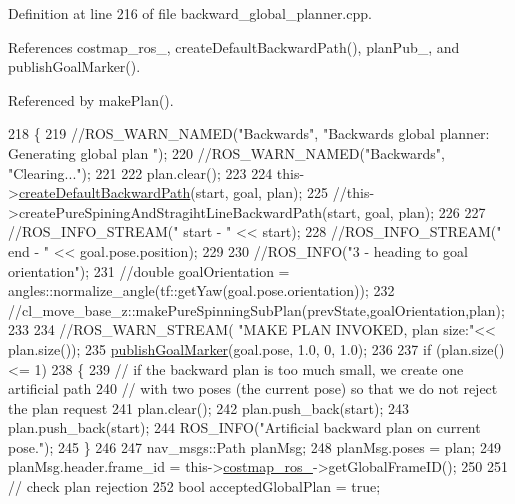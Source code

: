 Definition at line 216 of file backward\+\_\+global\+\_\+planner.\+cpp.



References costmap\+\_\+ros\+\_\+, create\+Default\+Backward\+Path(), plan\+Pub\+\_\+, and publish\+Goal\+Marker().



Referenced by make\+Plan().


\begin{DoxyCode}
218 \{
219     \textcolor{comment}{//ROS\_WARN\_NAMED("Backwards", "Backwards global planner: Generating global plan ");}
220     \textcolor{comment}{//ROS\_WARN\_NAMED("Backwards", "Clearing...");}
221 
222     plan.clear();
223 
224     this->\hyperlink{classcl__move__base__z_1_1backward__global__planner_1_1BackwardGlobalPlanner_a1b4d2eb717f9f63f2309def37c6ce297}{createDefaultBackwardPath}(start, goal, plan);
225     \textcolor{comment}{//this->createPureSpiningAndStragihtLineBackwardPath(start, goal, plan);}
226 
227     \textcolor{comment}{//ROS\_INFO\_STREAM(" start - " << start);}
228     \textcolor{comment}{//ROS\_INFO\_STREAM(" end - " << goal.pose.position);}
229 
230     \textcolor{comment}{//ROS\_INFO("3 - heading to goal orientation");}
231     \textcolor{comment}{//double goalOrientation = angles::normalize\_angle(tf::getYaw(goal.pose.orientation));}
232     \textcolor{comment}{//cl\_move\_base\_z::makePureSpinningSubPlan(prevState,goalOrientation,plan);}
233 
234     \textcolor{comment}{//ROS\_WARN\_STREAM( "MAKE PLAN INVOKED, plan size:"<< plan.size());}
235     \hyperlink{classcl__move__base__z_1_1backward__global__planner_1_1BackwardGlobalPlanner_a3c6784cad10fdadf28323380fe3d6d2b}{publishGoalMarker}(goal.pose, 1.0, 0, 1.0);
236 
237     \textcolor{keywordflow}{if} (plan.size() <= 1)
238     \{
239         \textcolor{comment}{// if the backward plan is too much small, we create one artificial path}
240         \textcolor{comment}{// with two poses (the current pose) so that we do not reject the plan request        }
241         plan.clear();
242         plan.push\_back(start);
243         plan.push\_back(start);
244         ROS\_INFO(\textcolor{stringliteral}{"Artificial backward plan on current pose."});
245     \}
246 
247     nav\_msgs::Path planMsg;
248     planMsg.poses = plan;
249     planMsg.header.frame\_id = this->\hyperlink{classcl__move__base__z_1_1backward__global__planner_1_1BackwardGlobalPlanner_a7103c15e6540a514acd421c3c6e194a4}{costmap\_ros\_}->getGlobalFrameID();
250 
251         \textcolor{comment}{// check plan rejection}
252     \textcolor{keywordtype}{bool} acceptedGlobalPlan = \textcolor{keyword}{true};

\end{DoxyCode}
